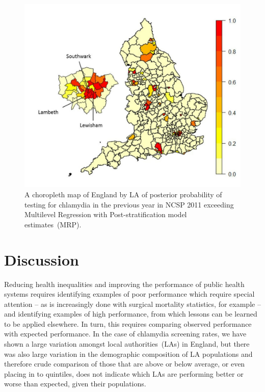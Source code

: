 \documentclass[fleqn,10pt]{wlscirep}
\begin{document}
\begin{figure}[!ht]
\centering
\includegraphics[width=5in]{Figure-6__Green__choropleth-map}
\caption{A choropleth map of England by LA of posterior probability of testing for chlamydia in the previous year in
NCSP 2011 exceeding Multilevel Regression with Post-stratification model estimates~(MRP).}
\label{fig:choropleth}
\end{figure}

\section*{Discussion}
Reducing health inequalities and improving the performance of public health systems requires identifying examples of poor performance which require special attention – as is increasingly done with surgical mortality statistics, for example – and identifying examples of high performance, from which lessons can be learned to be applied elsewhere. In turn, this requires comparing observed performance with expected performance. In the case of chlamydia screening rates, we have shown a large variation amongst local authorities~(LAs) in England, but there was also large variation in the demographic composition of LA populations and therefore crude comparison of those that are above or below average, or even placing in to quintiles, does not indicate which LAs are performing better or worse than expected, given their populations.
\end{document}
